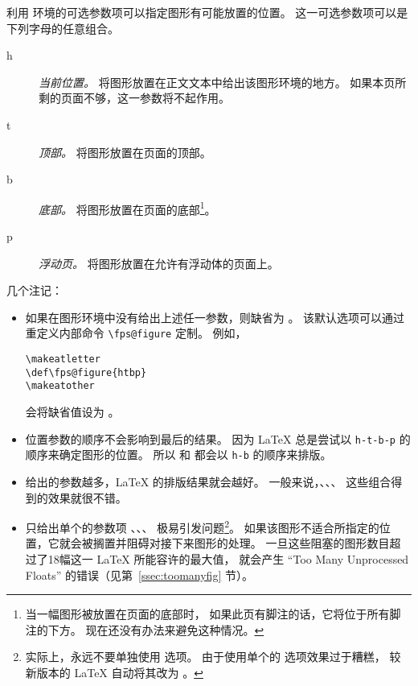 利用  环境的可选参数项可以指定图形有可能放置的位置。
这一可选参数项可以是下列字母的任意组合。
\begin{description}
	\item [h] \emph{当前位置。} 
	将图形放置在正文文本中给出该图形环境的地方。
	如果本页所剩的页面不够，这一参数将不起作用。
	\item [t] \emph{顶部。} 将图形放置在页面的顶部。
	\item [b] \emph{底部。} 将图形放置在页面的底部\footnote{
        当一幅图形被放置在页面的底部时，
		如果此页有脚注的话，它将位于所有脚注的下方。
		现在还没有办法来避免这种情况。}。
	\item [p] \emph{浮动页。} 将图形放置在允许有浮动体的页面上。
\end{description}

几个注记：
\begin{itemize}
	\item 如果在图形环境中没有给出上述任一参数，则缺省为 \opt{[tbp]}。
	该默认选项可以通过重定义内部命令 \verb|\fps@figure| 定制。
	例如，
\begin{lstlisting}
\makeatletter
\def\fps@figure{htbp}
\makeatother
\end{lstlisting}
	会将缺省值设为 \opt{[htbp]}。
	
	\item 位置参数的顺序不会影响到最后的结果。
	因为 \LaTeX{} 总是尝试以 \texttt{h-t-b-p} 的顺序来确定图形的位置。
	所以 \opt{[hb]} 和 \opt{[bh]} 都会以 \texttt{h-b}	的顺序来排版。
	
	\item 给出的参数越多，\LaTeX{} 的排版结果就会越好。
	一般来说，\opt{[htbp]}、\opt{[tbp]}、\opt{[htp]}、\opt{[tp]} 这些组合得到的效果就很不错。
	
	\item 只给出单个的参数项 \opt{[t]}、\opt{[b]}、\opt{[p]}、\opt{[h]} 极易引发问题\footnote{
        实际上，永远不要单独使用 \opt{[h]} 选项。
		由于使用单个的 \opt{[h]} 选项效果过于糟糕，
		较新版本的 \LaTeX{} 自动将其改为 \opt{[ht]}。}。
	如果该图形不适合所指定的位置，它就会被搁置并阻碍对接下来图形的处理。
	一旦这些阻塞的图形数目超过了18幅这一 \LaTeX{} 所能容许的最大值，
	就会产生 ``Too Many Unprocessed Floats'' 的错误（见第~\ref{ssec:toomanyfig} 节）。
\end{itemize}

